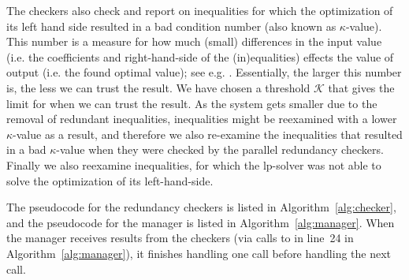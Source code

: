 The checkers also check and report on inequalities for which the optimization of its left hand side resulted in a bad condition number (also known as $\kappa$-value). This number is a measure for how much (small) differences in the input value (i.e. the coefficients and right-hand-side of the (in)equalities) effects the value of output (i.e. the found optimal value); see {e.g. \cite{numAnalysis}}. Essentially, the larger this number is, the less we can trust the result. We have chosen a threshold $\mathcal{K}$ that gives the limit for when we can trust the result. As the system gets smaller due to the removal of redundant inequalities, inequalities might be reexamined with a lower $\kappa$-value as a result, and therefore we also re-examine the inequalities that resulted in a bad $\kappa$-value when they were checked by the parallel redundancy checkers. 
Finally we also reexamine inequalities, for which the lp-solver was not able to solve the optimization of its left-hand-side.

The pseudocode for the redundancy checkers is listed in Algorithm~\ref{alg:checker}, and the pseudocode for the manager is listed in Algorithm~\ref{alg:manager}. 
When the manager receives results from the checkers (via calls to  in line~24 in Algorithm~\ref{alg:manager}), it finishes handling one call before handling the next call. %

